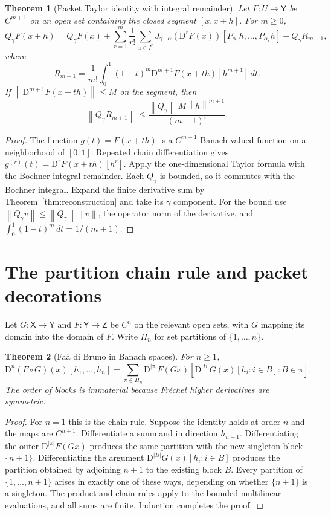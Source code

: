 \documentclass[11pt]{article}
\newtheorem{theorem}{Theorem}[section]
\theoremstyle{remark}\newtheorem{remark}[theorem]{Remark}
\newcommand{\X}{\mathsf X}\newcommand{\Y}{\mathsf Y}\newcommand{\Z}{\mathsf Z}
\newcommand{\norm}[1]{\left\lVert#1\right\rVert}
\newcommand{\D}{\mathrm D}
\begin{document}
\begin{theorem}[Packet Taylor identity with integral remainder]\label{thm:taylor}
Let $F:U\to\Y$ be $C^{m+1}$ on an open set containing the closed segment $[x,x+h]$. For $m\ge0$,
\[
Q_\gamma F(x+h)=Q_\gamma F(x)
+\sum_{r=1}^{m}\frac{1}{r!}\sum_{\alpha\in I^r}
J_{\gamma\mid\alpha}(\D^rF(x))
[P_{\alpha_1}h,\ldots,P_{\alpha_r}h]
+Q_\gamma R_{m+1},
\]
where
\[
R_{m+1}=\frac1{m!}\int_0^1(1-t)^m\D^{m+1}F(x+th)[h^{m+1}]\,dt.
\]
If $\norm{\D^{m+1}F(x+th)}\le M$ on the segment, then
\[
\norm{Q_\gamma R_{m+1}}\le\frac{\norm{Q_\gamma}\,M\norm{h}^{m+1}}{(m+1)!}.
\]
\end{theorem}
\begin{proof}
The function $g(t)=F(x+th)$ is a $C^{m+1}$ Banach-valued function on a neighborhood of $[0,1]$. Repeated chain differentiation gives $g^{(r)}(t)=\D^rF(x+th)[h^r]$. Apply the one-dimensional Taylor formula with the Bochner integral remainder. Each $Q_\gamma$ is bounded, so it commutes with the Bochner integral. Expand the finite derivative sum by Theorem~\ref{thm:reconstruction} and take its $\gamma$ component. For the bound use $\norm{Q_\gamma v}\le\norm{Q_\gamma}\norm{v}$, the operator norm of the derivative, and $\int_0^1(1-t)^m\,dt=1/(m+1)$.
\end{proof}

\section{The partition chain rule and packet decorations}
Let $G:\X\to\Y$ and $F:\Y\to\Z$ be $C^n$ on the relevant open sets, with $G$ mapping its domain into the domain of $F$. Write $\Pi_n$ for set partitions of $\{1,\ldots,n\}$.
\begin{theorem}[Fa\`a di Bruno in Banach spaces]\label{thm:faa}
For $n\ge1$,
\[
\D^n(F\circ G)(x)[h_1,\ldots,h_n]
=\sum_{\pi\in\Pi_n}\D^{|\pi|}F(Gx)
\left[\D^{|B|}G(x)[h_i:i\in B]:B\in\pi\right].
\]
The order of blocks is immaterial because Fr\'echet higher derivatives are symmetric.
\end{theorem}
\begin{proof}
For $n=1$ this is the chain rule. Suppose the identity holds at order $n$ and the maps are $C^{n+1}$. Differentiate a summand in direction $h_{n+1}$. Differentiating the outer $\D^{|\pi|}F(Gx)$ produces the same partition with the new singleton block $\{n+1\}$. Differentiating the argument $\D^{|B|}G(x)[h_i:i\in B]$ produces the partition obtained by adjoining $n+1$ to the existing block $B$. Every partition of $\{1,\ldots,n+1\}$ arises in exactly one of these ways, depending on whether $\{n+1\}$ is a singleton. The product and chain rules apply to the bounded multilinear evaluations, and all sums are finite. Induction completes the proof.
\end{proof}
\end{document}
